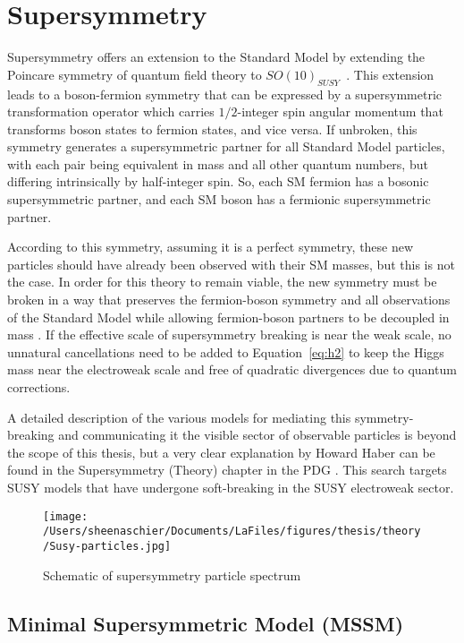 \section{Supersymmetry}
\label{sec:susy}
Supersymmetry offers an extension to the Standard Model by extending the Poincare symmetry of quantum field theory to $SO(10)_{SUSY}$~\cite{Martin:1997ns}.  This extension leads to a boson-fermion symmetry that can be expressed by a supersymmetric transformation operator which carries $1/2$-integer spin angular momentum that transforms boson states to fermion states, and vice versa.  If unbroken, this symmetry generates a supersymmetric partner for all Standard Model particles, with each pair being equivalent in mass and all other quantum numbers, but differing intrinsically by half-integer spin.  So, each SM fermion has a bosonic supersymmetric partner, and each SM boson has a fermionic supersymmetric partner.  

According to this symmetry, assuming it is a perfect symmetry, these new particles should have already been observed with their SM masses, but this is not the case.  In order for this theory to remain viable, the new symmetry must be broken in a way that preserves the fermion-boson symmetry and all observations of the Standard Model while allowing fermion-boson partners to be decoupled in mass \cite{HAAG1975257}.  If the effective scale of supersymmetry breaking is near the weak scale, no unnatural cancellations need to be added to Equation~\ref{eq:h2} to keep the Higgs mass near the electroweak scale and free of quadratic divergences due to quantum corrections.  

A detailed description of the various models for mediating this symmetry-breaking and communicating it the visible sector of observable particles is beyond the scope of this thesis, but a very clear explanation by Howard Haber can be found in the Supersymmetry (Theory) chapter in the PDG \cite{haber}.   This search targets SUSY models that have undergone soft-breaking in the SUSY electroweak sector. 

  \begin{figure}[tbp]
    \centering
 \texttt{[image: /Users/sheenaschier/Documents/LaFiles/figures/thesis/theory/Susy-particles.jpg]}
    \caption{Schematic of supersymmetry particle spectrum}
   \label{fig:susy}
 \end{figure}

\subsection{Minimal Supersymmetric Model (MSSM)}


